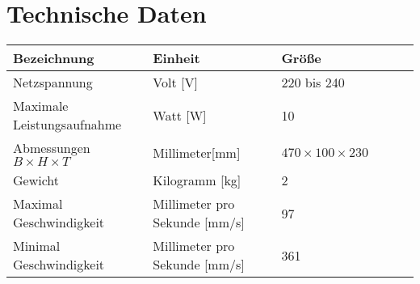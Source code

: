 %
%

\chapter{Technische Daten}
	\fontsize{8}{10}\selectfont
\begin{tabularx}{\textwidth}{|X|X|X|X|p{1cm}|X|}
	\hline 
	\textbf{Bezeichnung} & \textbf{Einheit} & \textbf{Größe} \\ \hline
	Netzspannung & Volt [V] & 220 bis 240  \\
	\hline
	Maximale Leistungsaufnahme & Watt [W] & 10  \\
	\hline
    Abmessungen $B \times H \times T$ & Millimeter[mm] & $470 \times 100 \times 230$ \\
    \hline
    Gewicht & Kilogramm [kg] & 2 \\
    \hline 
    Maximal Geschwindigkeit & Millimeter pro Sekunde [mm/s] & 97 \\
    \hline	
    Minimal Geschwindigkeit & Millimeter pro Sekunde [mm/s] & 361 \\
    \hline
    \end{tabularx}





